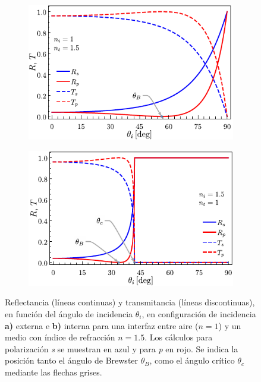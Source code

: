 \begin{figure}[t!]\centering\hspace*{-1.5em}
	\begin{subfigure}{.05\textwidth}\vspace{-4.5cm}\caption{}\label{sfig:frsnelExt}\end{subfigure}
	\begin{subfigure}{.43\textwidth} \hspace*{-.7cm}
	\includegraphics[scale=1]{1-Teoria/figs/1-2-FrsnelExt}
	\end{subfigure}
	\begin{subfigure}{.05\textwidth}\vspace{-4.5cm}\caption{}\label{sfig:frsenlInt}\end{subfigure}
	\begin{subfigure}{.43\textwidth} \hspace*{-.7cm}
	\includegraphics[scale=1]{1-Teoria/figs/1-2-FrsnelInt}
	\end{subfigure}\vspace*{-.7em}
	\caption{  Reflectancia (líneas continuas) y transmitancia (líneas discontinuas), en función del ángulo de incidencia $\theta_i$, en configuración de incidencia \textbf{a)} externa e \textbf{b)} interna para una interfaz entre  aire ($n=1$) y un medio con índice de refracción $n = 1.5$. Los cálculos para polarización  \emph{s} se muestran  en azul y  para \emph{p} en rojo. Se indica la posición tanto el ángulo de Brewster $\theta_B$, como el ángulo crítico $\theta_c$ mediante las flechas grises.}	\label{fig:frsnel}	
	\end{figure}	
%